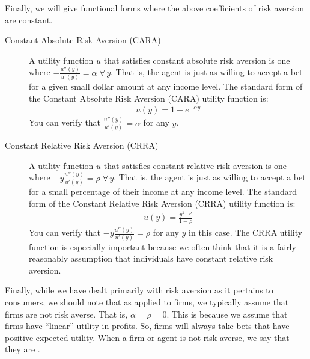 Finally, we will give functional forms where the above coefficients of risk aversion are constant. 
\begin{description}
    \item[Constant Absolute Risk Aversion (CARA)] A utility function $u$ that satisfies constant absolute risk aversion is one where $-\frac{u''(y)}{u'(y)} = \alpha \; \forall \, y$. That is, the agent is just as willing to accept a bet for a given small dollar amount at any income level. The standard form of the Constant Absolute Risk Aversion (CARA) utility function is:
    \begin{align*}
        u(y) = 1 - e^{-\alpha y}
    \end{align*} 
    You can verify that $\frac{u''(y)}{u'(y)} = \alpha$ for any $y$. 
    \item[Constant Relative Risk Aversion (CRRA)] A utility function $u$ that satisfies constant relative risk aversion is one where $-y \frac{u''(y)}{u'(y)} = \rho \; \forall \, y$. That is, the agent is just as willing to accept a bet for a small percentage of their income at any income level. The standard form of the Constant Relative Risk Aversion (CRRA) utility function is: 
    \begin{align*}
        u(y) = \frac{y^{1 - \rho}}{1 - \rho}
    \end{align*} 
    You can verify that $-y\frac{u''(y)}{u'(y)} = \rho$ for any $y$ in this case. The CRRA utility function is especially important because we often think that it is a fairly reasonably assumption that individuals have constant relative risk aversion. 
\end{description}

Finally, while we have dealt primarily with risk aversion as it pertains to consumers, we should note that as applied to firms, we typically assume that firms are not risk averse. That is, $\alpha = \rho = 0$. This is because we assume that firms have ``linear'' utility in profits. So, firms will always take bets that have positive expected utility. When a firm or agent is not risk averse, we say that they are .  